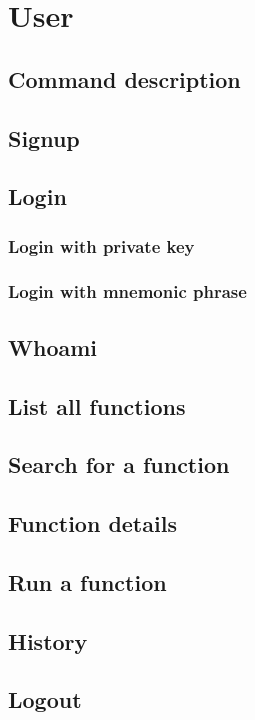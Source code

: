 \section{User}

\subsection{Command description}

\subsection{Signup}

\subsection{Login}

\subsubsection{Login with private key}

\subsubsection{Login with mnemonic phrase}

\subsection{Whoami}

\subsection{List all functions}

\subsection{Search for a function}

\subsection{Function details}

\subsection{Run a function}

\subsection{History}

\subsection{Logout}